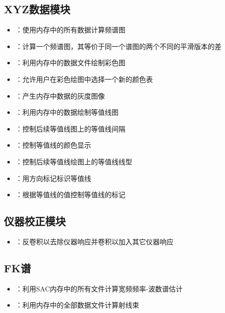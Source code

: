 \subsection*{XYZ数据模块}
\begin{itemize}
\item {}：使用内存中的所有数据计算频谱图
\item {}：计算一个频谱图，其等价于同一个谱图的两个不同的平滑版本的差
\item {}：利用内存中的数据文件绘制彩色图
\item {}：允许用户在彩色绘图中选择一个新的颜色表
\item {}：产生内存中数据的灰度图像
\item {}：利用内存中的数据绘制等值线图
\item {}：控制后续等值线图上的等值线间隔
\item {}：控制等值线的颜色显示
\item {}：控制后续等值线绘图上的等值线线型
\item {}：用方向标记标识等值线
\item {}：根据等值线的值控制等值线的标记
\end{itemize}

\subsection*{仪器校正模块}
\begin{itemize}
\item {}：反卷积以去除仪器响应并卷积以加入其它仪器响应
\end{itemize}

\subsection*{FK谱}
\begin{itemize}
\item {}：利用SAC内存中的所有文件计算宽频频率-波数谱估计
\item {}：利用内存中的全部数据文件计算射线束
\end{itemize}

\newpage
